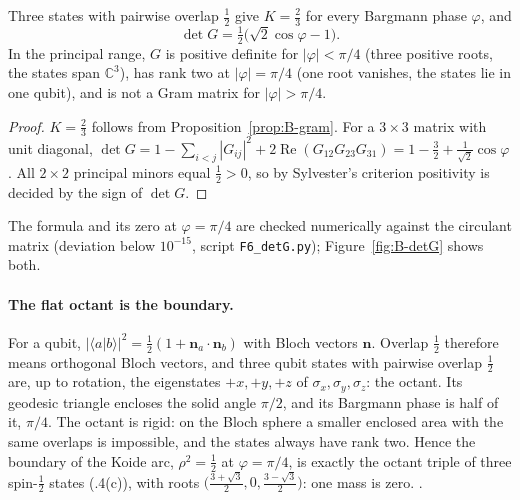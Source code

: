 \begin{proposition}\label{prop:B-bent}
Three states with pairwise overlap $\tfrac12$ give $K=\tfrac23$ for every Bargmann phase $\varphi$, and
\begin{equation}
 \det G=\tfrac12\bigl(\sqrt2\cos\varphi-1\bigr).
 \label{eq:B-detG}
\end{equation}
In the principal range, $G$ is positive definite for $|\varphi|<\pi/4$ (three positive roots, the states span
$\mathbb C^3$), has rank two at $|\varphi|=\pi/4$ (one root vanishes, the states lie in one qubit), and is not a Gram
matrix for $|\varphi|>\pi/4$.
\end{proposition}

\begin{proof}
$K=\tfrac23$ follows from Proposition~\ref{prop:B-gram}. For a $3\times3$ matrix with unit diagonal,
$\det G=1-\sum_{i<j}|G_{ij}|^2+2\operatorname{Re}(G_{12}G_{23}G_{31})=1-\tfrac32+\tfrac{1}{\sqrt2}\cos\varphi$. All
$2\times2$ principal minors equal $\tfrac12>0$, so by Sylvester's criterion positivity is decided by the sign of $\det G$.
\end{proof}

The formula and its zero at $\varphi=\pi/4$ are checked numerically against the circulant matrix (deviation below
$10^{-15}$, script \texttt{F6\_detG.py}); Figure~\ref{fig:B-detG} shows both.

\paragraph{The flat octant is the boundary.}
For a qubit, $|\langle a|b\rangle|^2=\tfrac12(1+\mathbf n_a\cdot\mathbf n_b)$ with Bloch vectors $\mathbf n$. Overlap $\tfrac12$
therefore means orthogonal Bloch vectors, and three qubit states with pairwise overlap $\tfrac12$ are, up to rotation, the
eigenstates $+x,+y,+z$ of $\sigma_x,\sigma_y,\sigma_z$: the octant. Its geodesic triangle encloses the solid angle $\pi/2$,
and its Bargmann phase is half of it, $\pi/4$. The octant is rigid: on the Bloch sphere a smaller enclosed area with the
same overlaps is impossible, and the states always have rank two. Hence the boundary of the Koide arc,
$\rho^2=\tfrac12$ at $\varphi=\pi/4$, is exactly the octant triple of three spin-$\tfrac12$ states (.4(c)),
with roots $\bigl(\tfrac{3+\sqrt3}{2},0,\tfrac{3-\sqrt3}{2}\bigr)$: one mass is zero. \Established.

